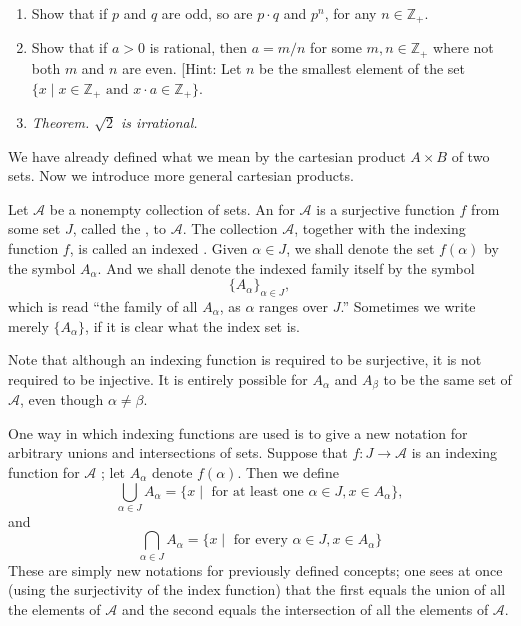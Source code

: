 \begin{enumerate}[itemsep=0.4em, parsep=0pt, topsep=0pt, partopsep=0pt, leftmargin=*, label=\arabic*., ref=\arabic*]
\begin{enumerate}[itemsep=0.2em, parsep=0pt, topsep=0pt, partopsep=0pt, leftmargin=*, label=(\alph*), align=left]
  \item Show that if \(p\) and \(q\) are odd, so are \(p \cdot q\) and \(p^{n}\), for any \(n \in {\mathbb{Z}}_{+}\).
  \item Show that if \(a > 0\) is rational, then \(a = m/n\) for some \(m,n \in {\mathbb{Z}}_{+}\) where not both \(m\) and \(n\) are even. [Hint: Let \(n\) be the smallest element of the set \(\{ {x \mid x \in {\mathbb{Z}}_{+}\text{ and }x \cdot a \in {\mathbb{Z}}_{+}}\}\).
  \item \textsl{Theorem. \(\sqrt{2}\) is irrational.}
  \end{enumerate}
\end{enumerate}


We have already defined what we mean by the cartesian product \(A \times B\) of two sets. 
Now we introduce more general cartesian products.

\begin{definition}
 Let \(\mathcal{A}\) be a nonempty collection of sets. An  for \(\mathcal{A}\) is a surjective function \(f\) from some set \(J\), called the , to \(\mathcal{A}\). The collection \(\mathcal{A}\), together with the indexing function \(f\), is called an indexed . Given \(\alpha \in J\), we shall denote the set \(f(\alpha)\) by the symbol \(A_{\alpha }\). And we shall denote the indexed family itself by the symbol
 \[
 {\{ A_{\alpha }\} }_{\alpha \in J},
 \]
 which is read ``the family of all \(A_{\alpha}\), as \(\alpha\) ranges over \(J\).'' Sometimes we write merely \(\{ A_{\alpha }\}\), if it is clear what the index set is.
\end{definition}

Note that although an indexing function is required to be surjective, 
it is not required to be injective. It is entirely possible for \(A_{\alpha}\) 
and \(A_{\beta}\) to be the same set of \(\mathcal{A}\), even though \(\alpha \neq \beta\).

One way in which indexing functions are used is to give a new notation for 
arbitrary unions and intersections of sets. Suppose that \(f : J \rightarrow \mathcal{A}\) 
is an indexing function for \(\mathcal{A}\) ; let \(A_{\alpha }\) denote \(f(\alpha)\). 
Then we define
\[
\mathop{\bigcup }\limits_{{\alpha \in J}}A_{\alpha } = \{ {x \mid \text{ for at least one }\alpha \in J,x \in {A}_{\alpha }}\} ,
\]
and
\[
\mathop{\bigcap }\limits_{{\alpha \in J}}A_{\alpha } = \{ {x \mid \text{ for every }\alpha \in J,x \in {A}_{\alpha }}\}
\]
These are simply new notations for previously defined concepts; one sees at
once (using the surjectivity of the index function) that the first equals 
the union of all the elements of \(\mathcal{A}\) and the second equals the intersection 
of all the elements of \(\mathcal{A}\).

